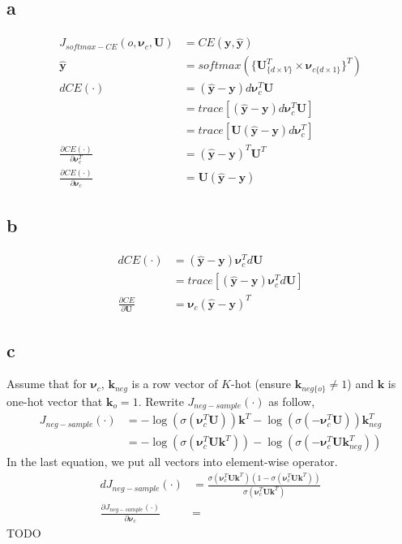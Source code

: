 \documentclass[11pt, oneside]{article}   	%
\begin{document}
\subsection{a}
\begin{align}
J_{softmax-CE}(o, \bm{\nu}_c, \bm{U}) &= CE(\bm{y}, \hat{\bm{y}})\\
\hat{\bm{y}} &= softmax(\{\bm{U}_{\{d\times V\}}^T \times \bm{\nu}_{c\{d\times 1\}}\}^T)\\
d CE(\cdot) &= (\hat{\bm{y}} - \bm{y}) d \bm{\nu}_c^T \bm{U}\\
&= trace[(\hat{\bm{y}} - \bm{y}) d \bm{\nu}_c^T \bm{U}]\\
&= trace[ \bm{U}(\hat{\bm{y}} - \bm{y})d \bm{\nu}_c^T]\\
\frac{\partial CE(\cdot)}{\partial \bm{\nu}_c^T} &= (\hat{\bm{y}} - \bm{y})^T\bm{U}^T\\
\frac{\partial CE(\cdot)}{\partial \bm{\nu}_c} &= \bm{U}(\hat{\bm{y}} - \bm{y})
\end{align}

\subsection{b}
\begin{align}
d CE(\cdot) &= (\hat{\bm{y}} - \bm{y}) \bm{\nu}_c^T d\bm{U}\\
&= trace[(\hat{\bm{y}} - \bm{y}) \bm{\nu}_c^T d\bm{U}]\\
\frac{\partial CE}{\partial \bm{U}} &= \bm{\nu}_c(\hat{\bm{y}} - \bm{y})^T
\end{align}

\subsection{c}
Assume that for $\bm{\nu}_c$, $\bm{k}_{neg}$ is a row vector of $K$-hot (ensure $\bm{k}_{neg\{o\}} \neq 1$) and $\bm{k}$ is one-hot vector that $\bm{k}_o = 1$. Rewrite $J_{neg-sample}(\cdot)$ as follow,
\begin{align}
J_{neg-sample}(\cdot) &= -\log (\sigma(\bm{\nu}_c^T\bm{U}))\bm{k}^T - \log(\sigma(-\bm{\nu}_c^T\bm{U}))\bm{k}_{neg}^T\\
&= -\log(\sigma(\bm{\nu}_c^T\bm{U}\bm{k}^T)) - \log(\sigma(-\bm{\nu}_c^T\bm{U}\bm{k}_{neg}^T))
\end{align}
In the last equation, we put all vectors into element-wise operator.
\begin{align}
d J_{neg-sample}(\cdot) &= \frac{\sigma(\bm{\nu}_c^T\bm{U}\bm{k}^T)(1-\sigma(\bm{\nu}_c^T\bm{U}\bm{k}^T))}{\sigma(\bm{\nu}_c^T\bm{U}\bm{k}^T)}\\
\frac{\partial J_{neg-sample}(\cdot)}{\partial \bm\nu_c} &= 
\end{align}
TODO
\end{document}
